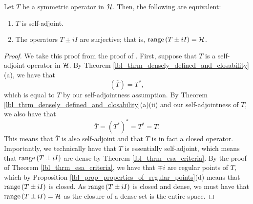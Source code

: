 \begin{theorem}\label{lbl_thrm_sa_criteria}
  Let $T$ be a symmetric operator in $\mathcal{H}$. Then, the following are equivalent:
  \begin{enumerate}[label = (\alph*)]
    \item $T$ is self-adjoint.
    \item The operators $T \pm iI$ are surjective; that is, $\operatorname{range}\left(T \pm iI\right) = \mathcal{H}$.
  \end{enumerate}
\end{theorem}
\begin{proof}
  We take this proof from the proof of {\cite[Proposition 9.23]{Hall2013}}. First, suppose that $T$ is a self-adjoint operator in $\mathcal{H}$. By Theorem \eqref{lbl_thrm_densely_defined_and_closability}(a), we have that
  \begin{equation*}
    \left( \overline{T} \right) = T^*,
  \end{equation*}
  which is equal to $T$ by our self-adjointness assumption. By Theorem \eqref{lbl_thrm_densely_defined_and_closability}(a)(ii) and our self-adjointness of $T$, we also have that
  \begin{equation*}
    \overline{T}
    =
    \left( T^* \right)^*
    =
    T^*
    =
    T.
  \end{equation*}
  This means that $\overline{T}$ is also self-adjoint and that $T$ is in fact a closed operator. Importantly, we technically have that $T$ is essentially self-adjoint, which means that $\operatorname{range}\left(T \pm i I\right)$ are dense by Theorem \eqref{lbl_thrm_esa_criteria}. By the proof of Theorem \eqref{lbl_thrm_esa_criteria}, we have that $\mp i$ are regular points of $T$, which by Proposition \eqref{lbl_prop_properties_of_regular_points}(d) means that $\operatorname{range}\left(T \pm i I\right)$ is closed. As $\operatorname{range}\left(T \pm i I\right)$ is closed and dense, we must have that $\operatorname{range}\left(T \pm i I\right) = \mathcal{H}$ as the closure of a dense set is the entire space.

  \medskip


\end{proof}
